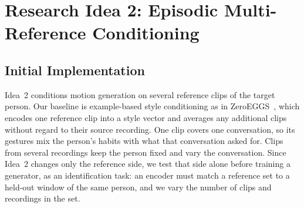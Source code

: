 
\section{Research Idea 2: Episodic Multi-Reference Conditioning}

\subsection{Initial Implementation}

Idea~2 conditions motion generation on several reference clips of the target person. Our baseline is example-based style conditioning as in ZeroEGGS~\citep{ghorbani2023zeroeggs}, which encodes one reference clip into a style vector and averages any additional clips without regard to their source recording. One clip covers one conversation, so its gestures mix the person's habits with what that conversation asked for. Clips from several recordings keep the person fixed and vary the conversation. Since Idea~2 changes only the reference side, we test that side alone before training a generator, as an identification task: an encoder must match a reference set to a held-out window of the same person, and we vary the number of clips and recordings in the set.

